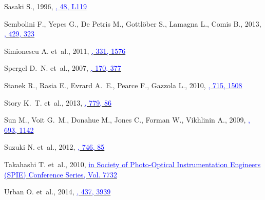 \documentclass[useAMS,usenatbib,usegraphicx]{mn2e}
\begin{document}
\begin{thebibliography}{}
{Sasaki} S., 1996,
  \href{http://adsabs.harvard.edu/abs/1996PASJ...48L.119S}{\textcolor{blue}{\pasj,
  48, L119}}

{Sembolini} F., {Yepes} G., {De Petris} M., {Gottl{\"o}ber} S., {Lamagna} L.,
  {Comis} B., 2013,
  \href{http://adsabs.harvard.edu/abs/2013MNRAS.429..323S}{\textcolor{blue}{\mnras,
  429, 323}}

{Simionescu} A. et~al., 2011,
  \href{http://adsabs.harvard.edu/abs/2011Sci...331.1576S}{\textcolor{blue}{\science,
  331, 1576}}

{Spergel} D.~N. et~al., 2007,
  \href{http://adsabs.harvard.edu/abs/2007ApJS..170..377S}{\textcolor{blue}{\apjs,
  170, 377}}

{Stanek} R., {Rasia} E., {Evrard} A.~E., {Pearce} F.,  {Gazzola} L., 2010,
  \href{http://adsabs.harvard.edu/abs/2010ApJ...715.1508S}{\textcolor{blue}{\apj,
  715, 1508}}

{Story} K.~T. et~al., 2013,
  \href{http://adsabs.harvard.edu/abs/2013ApJ...779...86S}{\textcolor{blue}{\apj,
  779, 86}}

{Sun} M., {Voit} G.~M., {Donahue} M., {Jones} C., {Forman} W.,  {Vikhlinin} A.,
  2009,
  \href{http://adsabs.harvard.edu/abs/2009ApJ...693.1142S}{\textcolor{blue}{\apj,
  693, 1142}}

{Suzuki} N. et~al., 2012,
  \href{http://adsabs.harvard.edu/abs/2012ApJ...746...85S}{\textcolor{blue}{\apj,
  746, 85}}

{Takahashi} T. et~al., 2010,
  \href{http://adsabs.harvard.edu/abs/2010SPIE.7732E..27T}{\textcolor{blue}{in
  Society of Photo-Optical Instrumentation Engineers (SPIE) Conference Series,
  Vol. 7732}}

{Urban} O. et~al., 2014,
  \href{http://adsabs.harvard.edu/abs/2014MNRAS.437.3939U}{\textcolor{blue}{\mnras,
  437, 3939}}


\end{thebibliography}
\end{document}
